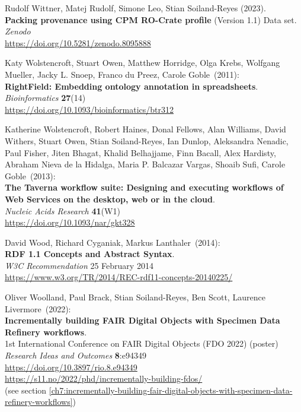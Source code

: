 \begin{thebibliography}{9}
Rudolf Wittner, Matej Rudolf, Simone Leo, Stian Soiland-Reyes (2023).\\
\textbf{Packing provenance using CPM RO-Crate profile} (Version 1.1)
Data set.\\
\emph{Zenodo}\\
\url{https://doi.org/10.5281/zenodo.8095888}

Katy Wolstencroft, Stuart Owen, Matthew Horridge, Olga Krebs, Wolfgang Mueller, Jacky L. Snoep, Franco du Preez, Carole Goble~(2011): \\
\textbf{RightField: Embedding ontology annotation in spreadsheets}. \\
\emph{Bioinformatics} \textbf{27}(14) \\
\url{https://doi.org/10.1093/bioinformatics/btr312}

Katherine Wolstencroft, Robert Haines, Donal Fellows, Alan Williams,
David Withers, Stuart Owen, Stian Soiland-Reyes, Ian Dunlop, Aleksandra
Nenadic, Paul Fisher, Jiten Bhagat, Khalid Belhajjame, Finn Bacall, Alex
Hardisty, Abraham Nieva de la Hidalga, Maria P. Balcazar Vargas, Shoaib
Sufi, Carole Goble~(2013): \\
\textbf{The {Taverna} workflow suite: Designing
and executing workflows of {Web Services} on the desktop, web or in the
cloud}. \\
\emph{Nucleic Acids Research} \textbf{41}(W1) \\
\url{https://doi.org/10.1093/nar/gkt328}

David Wood, Richard Cyganiak, Markus Lanthaler~(2014): \\
\textbf{RDF 1.1 Concepts and Abstract Syntax}.\\
\emph{W3C Recommendation} 25 February 2014\\
\url{https://www.w3.org/TR/2014/REC-rdf11-concepts-20140225/}

Oliver Woolland, Paul Brack, Stian Soiland-Reyes, Ben Scott, Laurence
Livermore~(2022): \\
\textbf{Incrementally building FAIR Digital Objects with Specimen Data
Refinery workflows}.\\
1st International Conference on FAIR Digital Objects
(FDO 2022) (poster)\\
\emph{Research Ideas and Outcomes} \textbf{8}:e94349\\
\url{https://doi.org/10.3897/rio.8.e94349}\\
\url{https://s11.no/2022/phd/incrementally-building-fdos/}\\
(see section \vref{ch7:incrementally-building-fair-digital-objects-with-specimen-data-refinery-workflows})


\end{thebibliography}
